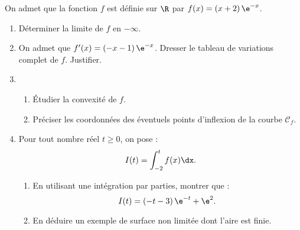 On admet que la fonction $f$ est définie sur $\R$ par $f(x) = (x + 2)\,\e^{-x}$.

\begin{enumerate}
	\item Déterminer la limite de $f$ en $-\infty$.
	\item On admet que $f'(x)=(-x-1)\,\e^{-x}$. Dresser le tableau de variations complet de $f$. Justifier.
	\item 
	\begin{enumerate}
		\item Étudier la convexité de $f$.
		\item Préciser les coordonnées des éventuels points d'inflexion de la courbe $\mathcal{C}_f$.
	\end{enumerate}
	\item Pour tout nombre réel $t \geqslant 0$, on pose : \[ I(t)=\int_{-2}^t f(x)\dx. \]
	\begin{enumerate}
		\item En utilisant une intégration  par parties, montrer que : \[ I(t)=(-t-3)\,\e^{-t}+\e^2. \]
		\item En déduire un exemple de surface non limitée dont l'aire est finie.
	\end{enumerate}
\end{enumerate}